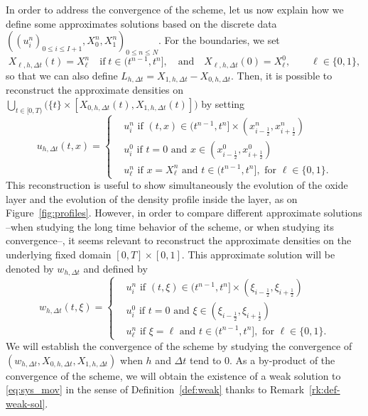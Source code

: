 \documentclass{amsart}
\newcommand\dt{\Delta t}
\begin{document}
In order to address the convergence of the scheme, let us now explain how we define some approximates solutions based on the discrete data 
$\left((u_i^n)_{0 \leq i \leq I+1}, X_0^n, X_1^n\right)_{0 \leq n \leq N}$. 
For the boundaries, we set 
\begin{equation}\label{eq:Xhdt}
X_{\ell, h,\dt}(t) = X_\ell^n \quad \text{if}\; t \in (t^{n-1}, t^n], \quad \text{and}\quad X_{\ell, h,\dt}(0) = X_\ell^0, \qquad \ell \in \{0,1\},
\end{equation}
so that we can also define $L_{h,\dt} = X_{1,h,\dt}- X_{0,h,\dt}$. Then, it is possible to reconstruct the approximate densities on  $\bigcup_{t \in [0,T)} \Big(\{t\} \times [X_{0,h,\dt}(t), X_{1,h,\dt}(t)] \Big)$ by setting 
$$
u_{h,\Delta t} (t,x) = 
\left\{\begin{aligned}
& u_i^n\mbox{ if } (t,x)\in (t^{n-1},t^n]\times (x_{i-\frac{1}{2}}^n, x_{i+\frac{1}{2}}^n) \\
& u_i^0 \mbox{ if } t=0 \mbox{ and }x\in(x_{i-\frac{1}{2}}^0, x_{i+\frac{1}{2}}^0) \\
& u_\ell^n \mbox{ if } x=X_\ell^n \mbox{ and } t\in (t^{n-1},t^n], \mbox { for } \ell\in \{0, 1\}.
\end{aligned}\right. 
$$
This reconstruction is useful to show simultaneously the evolution of the oxide layer and the evolution of the density profile inside the layer, as on Figure~\ref{fig:profiles}. However, in order to compare different approximate solutions --when studying the long time behavior of the scheme, or when studying its convergence--, it seems relevant to reconstruct the approximate densities on the underlying fixed domain $[0,T]\times [0,1]$. This approximate solution will be denoted by $w_{h,\Delta t}$ and defined by 
 \begin{equation}\label{eq:whdt}
 w_{h,\Delta t}(t,\xi) = 
 \left\{\begin{aligned}
& u_i^n\mbox{ if } (t,\xi)\in (t^{n-1},t^n]\times (\xi_{i-\frac{1}{2}}, \xi_{i+\frac{1}{2}}) \\
& u_i^0 \mbox{ if } t=0 \mbox{ and }\xi \in(\xi_{i-\frac{1}{2}}, \xi_{i+\frac{1}{2}}) \\
& u_\ell^n \mbox{ if } \xi=\ell \mbox{ and } t\in (t^{n-1},t^n], \mbox { for } \ell\in \{0, 1\}.
\end{aligned}\right. 
\end{equation}
We will establish the convergence of the scheme by studying the convergence of $(w_{h,\Delta t},X_{0,h,\Delta t}, X_{1,h,\Delta t})$ when $h$ and $\Delta t$ tend to 0. As a by-product of the convergence of the scheme, we will obtain the existence of a weak solution to \eqref{eq:sys_mov} in the sense of Definition~\ref{def:weak} thanks to Remark~\ref{rk:def-weak-sol}.
\end{document}
